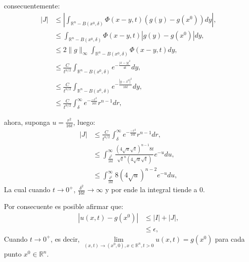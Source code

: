 \documentclass{beamer}
\begin{document}
\begin{frame}
  \begin{block}{}
    consecuentemente:
    \begin{align*}
      |J|&\leq \left| \int_{\mathbb{R}^{n}-B(x^{0},\delta)}\Phi(x-y,t)(g(y)-g(x^0))dy \right|,\\
      &\leq \int_{\mathbb{R}^{n}-B(x^{0},\delta)}\Phi(x-y,t)|g(y)-g(x^0)|dy,\\
      &\leq 2\|g\|_\infty\int_{\mathbb{R}^{n}-B(x^{0},\delta)}\Phi(x-y,t)dy,\\
      &\leq \frac{C}{t^{n/2}}\int_{\mathbb{R}^{n}-B(x^{0},\delta)}e^{-\frac{|x-y|^2}{4t}}dy,\\
      &\leq \frac{C}{t^{n/2}}\int_{\mathbb{R}^{n}-B(x^{0},\delta)}e^{-\frac{|y-x^0|^2}{16t}}dy,\\
      &\leq \frac{C}{t^{n/2}}\int_{\delta}^{\infty}e^{-\frac{-r^2}{16t}}r^{n-1}dr,
    \end{align*}
  \end{block}
\end{frame}

\begin{frame}
  \begin{block}{}
  ahora, suponga $u=\frac{r^2}{16t}$, luego:
    \begin{align*}
      |J|&\leq \frac{C}{t^{n/2}}\int_{\delta}^{\infty}e^{-\frac{-r^2}{16t}}r^{n-1}dr,\\
      &\leq\int_{\frac{\delta^2}{16t}}^{\infty}\frac{(4\sqrt{u}\sqrt{t})^{n-1}8t}{\sqrt{t}^n (4\sqrt{u}\sqrt{t})}e^{-u}du,\\
      &\leq \int_{\frac{\delta^2}{16t}}^{\infty}8(4\sqrt{u})^{n-2}e^{-u}du,
    \end{align*}
    La cual cuando $t\rightarrow 0^+$, $\frac{\delta^2}{16t}\rightarrow\infty$ y por ende la integral tiende a $0$.
  \end{block}
\end{frame}

\begin{frame}
  \begin{block}{}
    Por consecuente es posible afirmar que:
    \begin{align*}
      |u(x,t)-g(x^0)|&\leq |I|+|J|,\\
      &\leq \epsilon,
    \end{align*}
    Cuando $t\rightarrow 0^+$, es decir, $\underset{(x,t)\rightarrow(x^0,0),x\in\mathbb{R}^{n},t>0}{\lim}u(x,t)=g(x^0)$ para cada punto $x^0\in\mathbb{R}^{n}$.
  \end{block}  
\end{frame}
\end{document}
